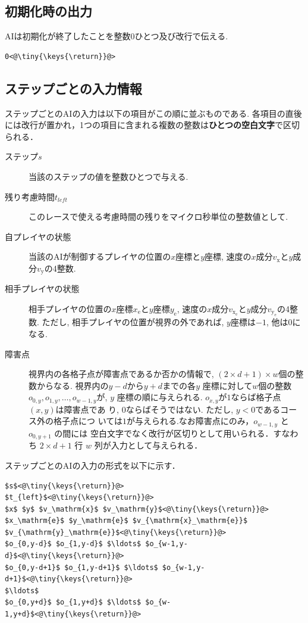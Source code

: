\documentclass[11pt]{jarticle}
\begin{document}
\subsection{初期化時の出力}\label{sec:output_init}
AIは初期化が終了したことを整数$0$ひとつ及び改行で伝える.

\begin{lstlisting}
0<@\tiny{\keys{\return}}@>
\end{lstlisting}

\subsection{ステップごとの入力情報}
ステップごとのAIの入力は以下の項目がこの順に並ぶものである.
各項目の直後には改行が置かれ，1つの項目に含まれる複数の整数は{\bf ひとつの空白文字}で区切られる．

\begin{description}
\item[ステップ$s$] 当該のステップの値を整数ひとつで与える.
\item[残り考慮時間$t_{left}$] このレースで使える考慮時間の残りをマイクロ秒単位の整数値として.
\item[自プレイヤの状態] 当該のAIが制御するプレイヤの位置の$x$座標と$y$座標, 速度の$x$成分$v_\mathrm{x}$と$y$成分$v_\mathrm{y}$の4整数.
\item[相手プレイヤの状態] 相手プレイヤの位置の$x$座標$x_\mathrm{e}$と$y$座標$y_\mathrm{e}$, 速度の$x$成分$v_{\mathrm{x}_\mathrm{e}}$と$y$成分$v_{\mathrm{y}_\mathrm{e}}$の4整数.
  ただし, 相手プレイヤの位置が視界の外であれば, $y$座標は$-1$, 他は$0$になる.
\item[障害点] 視界内の各格子点が障害点であるか否かの情報で,
  $(2\times d+1)\times w$個の整数からなる. 視界内の$y-d$から$y+d$までの各$y$
  座標に対して$w$個の整数$o_{0,y}, o_{1,y}, \ldots, o_{w-1,y}$が, $y$
  座標の順に与えられる.  $o_{x,y}$が$1$ならば格子点$(x,y)$は障害点であ
  り, $0$ならばそうではない.  ただし, $y<0$であるコース外の格子点につ
  いては$1$が与えられる.なお障害点にのみ，$o_{w-1,y}$ と $o_{0,y+1}$ の間には
  空白文字でなく改行が区切りとして用いられる．すなわち $2\times d+1$ 行 $w$ 列が入力として与えられる．
\end{description}

ステップごとのAIの入力の形式を以下に示す．
\begin{lstlisting}
$s$<@\tiny{\keys{\return}}@>
$t_{left}$<@\tiny{\keys{\return}}@>
$x$ $y$ $v_\mathrm{x}$ $v_\mathrm{y}$<@\tiny{\keys{\return}}@>
$x_\mathrm{e}$ $y_\mathrm{e}$ $v_{\mathrm{x}_\mathrm{e}}$ $v_{\mathrm{y}_\mathrm{e}}$<@\tiny{\keys{\return}}@>
$o_{0,y-d}$ $o_{1,y-d}$ $\ldots$ $o_{w-1,y-d}$<@\tiny{\keys{\return}}@>
$o_{0,y-d+1}$ $o_{1,y-d+1}$ $\ldots$ $o_{w-1,y-d+1}$<@\tiny{\keys{\return}}@>
$\ldots$
$o_{0,y+d}$ $o_{1,y+d}$ $\ldots$ $o_{w-1,y+d}$<@\tiny{\keys{\return}}@>
\end{lstlisting}
\end{document}
